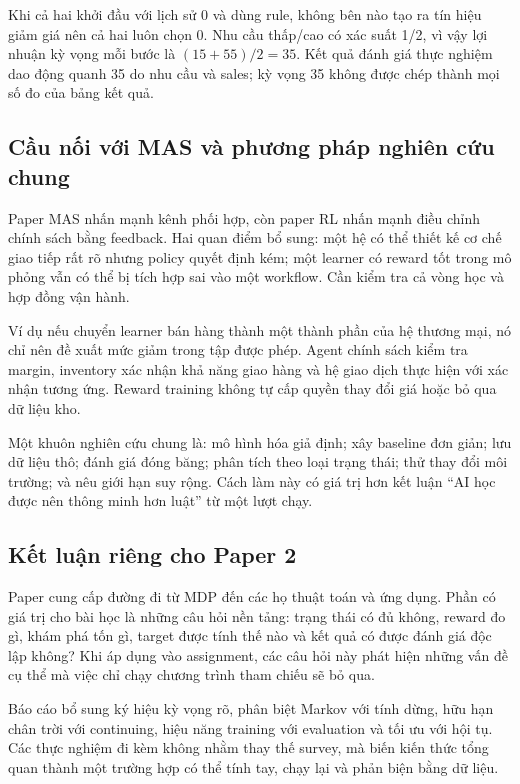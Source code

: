 Khi cả hai khởi đầu với lịch sử 0 và dùng rule, không bên nào tạo ra tín
hiệu giảm giá nên cả hai luôn chọn 0. Nhu cầu thấp/cao có xác suất 1/2,
vì vậy lợi nhuận kỳ vọng mỗi bước là \((15+55)/2=35\). Kết quả đánh giá
thực nghiệm dao động quanh 35 do nhu cầu và sales; kỳ vọng 35 không được
chép thành mọi số đo của bảng kết quả.

\subsection{Cầu nối với MAS và phương pháp nghiên cứu
chung}\label{cux1ea7u-nux1ed1i-vux1edbi-mas-vuxe0-phux1b0ux1a1ng-phuxe1p-nghiuxean-cux1ee9u-chung}

Paper MAS nhấn mạnh kênh phối hợp, còn paper RL nhấn mạnh điều chỉnh
chính sách bằng feedback. Hai quan điểm bổ sung: một hệ có thể thiết kế
cơ chế giao tiếp rất rõ nhưng policy quyết định kém; một learner có
reward tốt trong mô phỏng vẫn có thể bị tích hợp sai vào một workflow.
Cần kiểm tra cả vòng học và hợp đồng vận hành.

Ví dụ nếu chuyển learner bán hàng thành một thành phần của hệ thương
mại, nó chỉ nên đề xuất mức giảm trong tập được phép. Agent chính sách
kiểm tra margin, inventory xác nhận khả năng giao hàng và hệ giao dịch
thực hiện với xác nhận tương ứng. Reward training không tự cấp quyền
thay đổi giá hoặc bỏ qua dữ liệu kho.

Một khuôn nghiên cứu chung là: mô hình hóa giả định; xây baseline đơn
giản; lưu dữ liệu thô; đánh giá đóng băng; phân tích theo loại trạng
thái; thử thay đổi môi trường; và nêu giới hạn suy rộng. Cách làm này có
giá trị hơn kết luận ``AI học được nên thông minh hơn luật'' từ một lượt
chạy.

\subsection{Kết luận riêng cho Paper
2}\label{kux1ebft-luux1eadn-riuxeang-cho-paper-2}

Paper cung cấp đường đi từ MDP đến các họ thuật toán và ứng dụng. Phần
có giá trị cho bài học là những câu hỏi nền tảng: trạng thái có đủ
không, reward đo gì, khám phá tốn gì, target được tính thế nào và kết
quả có được đánh giá độc lập không? Khi áp dụng vào assignment, các câu
hỏi này phát hiện những vấn đề cụ thể mà việc chỉ chạy chương trình tham
chiếu sẽ bỏ qua.

Báo cáo bổ sung ký hiệu kỳ vọng rõ, phân biệt Markov với tính dừng, hữu
hạn chân trời với continuing, hiệu năng training với evaluation và tối
ưu với hội tụ. Các thực nghiệm đi kèm không nhằm thay thế survey, mà
biến kiến thức tổng quan thành một trường hợp có thể tính tay, chạy lại
và phản biện bằng dữ liệu.
